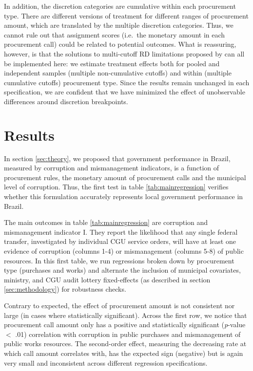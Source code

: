 \documentclass[11pt]{article}
\begin{document}
In addition, the discretion categories are cumulative within each procurement type. There are different versions of treatment for different ranges of procurement amount, which are translated by the multiple discretion categories. Thus, we cannot rule out that assignment scores (i.e.~the monetary amount in each procurement call) could be related to potential outcomes. What is reassuring, however, is that the solutions to multi-cutoff RD limitations proposed by \citet{CattaneoInterpretingRegressionDiscontinuity2016} can all be implemented here: we estimate treatment effects both for pooled and independent samples (multiple non-cumulative cutoffs) and within (multiple cumulative cutoffs) procurement type. Since the results remain unchanged in each specification, we are confident that we have minimized the effect of unobservable differences around discretion breakpoints.

\section{Results} \label{sec:result}

In section \ref{sec:theory}, we proposed that government performance in Brazil, measured by corruption and mismanagement indicators, is a function of procurement rules, the monetary amount of procurement calls and the municipal level of corruption. Thus, the first test in table \ref{tab:mainregression} verifies whether this formulation accurately represents local government performance in Brazil.


\clearpage

The main outcomes in table \ref{tab:mainregression} are corruption and mismanagement indicator I. They report the likelihood that any single federal transfer, investigated by individual CGU service orders, will have at least one evidence of corruption (columns 1-4) or mismanagement (columns 5-8) of public resources. In this first table, we run regressions broken down by procurement type (purchases and works) and alternate the inclusion of municipal covariates, ministry, and CGU audit lottery fixed-effects (as described in section \ref{sec:methodology}) for robustness checks.

Contrary to expected, the effect of procurement amount is not consistent nor large (in cases where statistically significant). Across the first row, we notice that procurement call amount only has a positive and statistically significant (\emph{p}-value $<$ .01) correlation with corruption in public purchases and mismanagement of public works resources. The second-order effect, measuring the decreasing rate at which call amount correlates with, has the expected sign (negative) but is again very small and inconsistent across different regression specifications.
\end{document}
